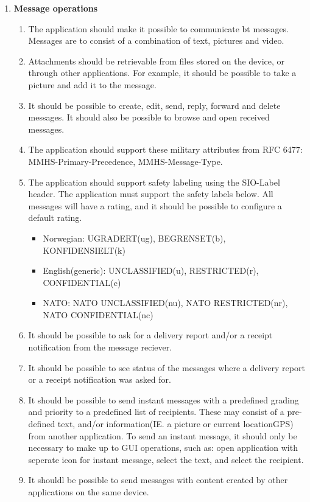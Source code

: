 \begin{enumerate}
\begin{enumerate}
\end{enumerate}
\item{}\textbf{Message operations}
\begin{enumerate}
\item{}The application should make it possible to communicate bt messages. Messages are to consist of a combination of text, pictures and video.
\item{}Attachments should be retrievable from files stored on the device, or through other applications. For example, it should be possible to take a picture and add it to the message.
\item{}It should be possible to create, edit, send, reply, forward and delete messages. It should also be possible to browse and open received messages.
\item{}The application should support these military attributes from RFC 6477: MMHS-Primary-Precedence, MMHS-Message-Type.
\item{}The application should support safety labeling using the SIO-Label header. The application must support the safety labels below. All messages will have a rating, and it should be possible to configure a default rating.
\begin{itemize}
\item{}Norwegian: UGRADERT(ug), BEGRENSET(b), KONFIDENSIELT(k)
\item{}English(generic): UNCLASSIFIED(u), RESTRICTED(r), CONFIDENTIAL(c)
\item{}NATO: NATO UNCLASSIFIED(nu), NATO RESTRICTED(nr), NATO CONFIDENTIAL(nc)
\end{itemize}
\item{}It should be possible to ask for a delivery report and/or a receipt notification from the message reciever.
\item{}It should be possible to see status of the messages where a delivery report or a receipt notification was asked for.
\item{}It should be possible to send instant messages with a predefined grading and priority to a predefined list of recipients. These may consist of a pre-defined text, and/or information(IE. a picture or current locationGPS) from another application. To send an instant message, it should only be necessary to make up to GUI operations, such as: open application with seperate icon for instant message, select the text, and select the recipient.
\item{}It shouldl be possible to send messages with content created by other applications on the same device.

\end{enumerate}
\end{enumerate}
